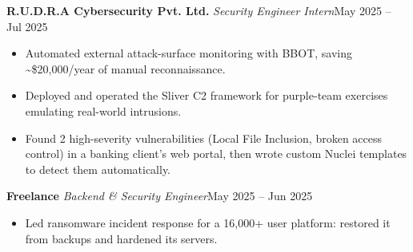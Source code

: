 \documentclass[10pt, a4paper]{article}
\newcommand{\role}[3]{\par\vspace{2.5pt}\textbf{#1} \textbar{} \textit{#2}\hfill #3\par}
\begin{document}
\role{R.U.D.R.A Cybersecurity Pvt. Ltd.}{Security Engineer Intern}{May 2025 -- Jul 2025}
\begin{itemize}
  \item Automated external attack-surface monitoring with BBOT, saving \textasciitilde{}\$20,000/year of manual reconnaissance.
  \item Deployed and operated the Sliver C2 framework for purple-team exercises emulating real-world intrusions.
  \item Found 2 high-severity vulnerabilities (Local File Inclusion, broken access control) in a banking client's web
  portal, then wrote custom Nuclei templates to detect them automatically.
\end{itemize}

\role{Freelance}{Backend \& Security Engineer}{May 2025 -- Jun 2025}
\begin{itemize}
  \item Led ransomware incident response for a 16,000+ user platform: restored it from backups and hardened its servers.
\end{itemize}
\end{document}

